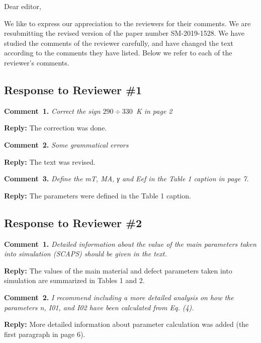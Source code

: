 \documentclass[aip,jap,preprint]{revtex4-1}
\begin{document}
Dear editor,

We like to express our appreciation to the reviewers for their comments.
We are resubmitting the revised version of the paper number  SM-2019-1528.
We have studied the comments of the reviewer carefully, and have changed the text according to the comments they
have listed.
Below we refer to each of the reviewer’s comments.



\subsection*{Response to Reviewer \#1 }

\noindent
\textcolor[rgb]{0.00,0.50,1.00}{\textbf{Comment~1.}}
\emph{Correct the sign $290\div330$~K in page 2}

\noindent
\textcolor[rgb]{0.51,0.00,0.00}{\textbf{Reply:}}
The correction was done.



\noindent
\textcolor[rgb]{0.00,0.50,1.00}{\textbf{Comment~2.}}
\emph{Some grammatical errors}

\noindent
\textcolor[rgb]{0.51,0.00,0.00}{\textbf{Reply:}}
The text was revised.

\noindent
\textcolor[rgb]{0.00,0.50,1.00}{\textbf{Comment~3.}}
\emph{ Define the mT, MA, γ and Eef in the Table 1 caption in page 7.}


\noindent
\textcolor[rgb]{0.51,0.00,0.00}{\textbf{Reply:}}
The parameters were defined in the Table 1 caption.


\subsection*{Response to Reviewer \#2 }

\noindent
\textcolor[rgb]{0.00,0.50,1.00}{\textbf{Comment~1.}}
\emph{Detailed information about the value of the main parameters taken into simulation (SCAPS) should be given in the text.}



\noindent
\textcolor[rgb]{0.51,0.00,0.00}{\textbf{Reply:}}
The values of the main material and defect parameters taken into simulation are summarized in Tables 1 and 2.



\noindent
\textcolor[rgb]{0.00,0.50,1.00}{\textbf{Comment~2.}}
\emph{ I recommend including a more detailed analysis on how the parameters n, I01, and I02 have been calculated from Eq. (4). }

\noindent
\textcolor[rgb]{0.51,0.00,0.00}{\textbf{Reply:}}
More detailed information about parameter calculation was added (the first paragraph in page 6).
\end{document}
